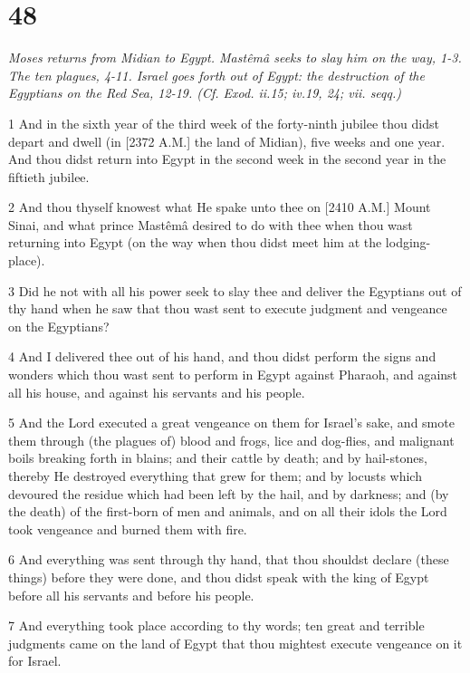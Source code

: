 \chapter{48}

\par \textit{Moses returns from Midian to Egypt. Mastêmâ seeks to slay him on the way, 1-3. The ten plagues, 4-11. Israel goes forth out of Egypt: the destruction of the Egyptians on the Red Sea, 12-19. (Cf. Exod. ii.15; iv.19, 24; vii. seqq.)}

\par 1 And in the sixth year of the third week of the forty-ninth jubilee thou didst depart and dwell (in [2372 A.M.] the land of Midian), five weeks and one year. And thou didst return into Egypt in the second week in the second year in the fiftieth jubilee.
\par 2 And thou thyself knowest what He spake unto thee on [2410 A.M.] Mount Sinai, and what prince Mastêmâ desired to do with thee when thou wast returning into Egypt (on the way when thou didst meet him at the lodging-place).
\par 3 Did he not with all his power seek to slay thee and deliver the Egyptians out of thy hand when he saw that thou wast sent to execute judgment and vengeance on the Egyptians?
\par 4 And I delivered thee out of his hand, and thou didst perform the signs and wonders which thou wast sent to perform in Egypt against Pharaoh, and against all his house, and against his servants and his people.
\par 5 And the Lord executed a great vengeance on them for Israel's sake, and smote them through (the plagues of) blood and frogs, lice and dog-flies, and malignant boils breaking forth in blains; and their cattle by death; and by hail-stones, thereby He destroyed everything that grew for them; and by locusts which devoured the residue which had been left by the hail, and by darkness; and (by the death) of the first-born of men and animals, and on all their idols the Lord took vengeance and burned them with fire.
\par 6 And everything was sent through thy hand, that thou shouldst declare (these things) before they were done, and thou didst speak with the king of Egypt before all his servants and before his people.
\par 7 And everything took place according to thy words; ten great and terrible judgments came on the land of Egypt that thou mightest execute vengeance on it for Israel.
